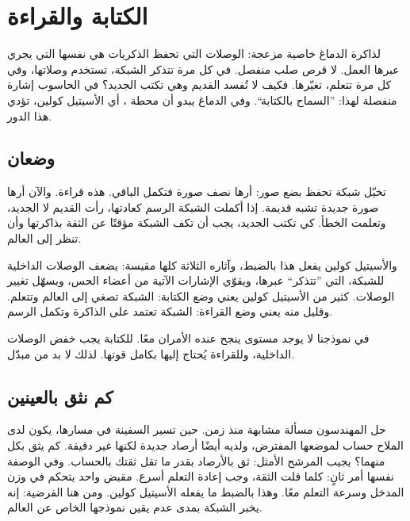 \chapter{الكتابة والقراءة}

لذاكرة الدماغ خاصية مزعجة: الوصلات التي تحفظ الذكريات هي نفسها التي يجري عبرها العمل. لا قرص صلب منفصل. في كل مرة تتذكر الشبكة، تستخدم وصلاتها، وفي كل مرة تتعلم، تغيّرها. فكيف لا تُفسد القديم وهي تكتب الجديد؟ في الحاسوب إشارة منفصلة لهذا: ”السماح بالكتابة“. وفي الدماغ يبدو أن محطة ، أي الأسيتيل كولين، تؤدي هذا الدور.

\section*{وضعان}

تخيّل شبكة تحفظ بضع صور: أرها نصف صورة فتكمل الباقي. هذه قراءة. والآن أرها صورة جديدة تشبه قديمة. إذا أكملت الشبكة الرسم كعادتها، رأت القديم لا الجديد، وتعلمت الخطأ. كي تكتب الجديد، يجب أن تكف الشبكة مؤقتًا عن الثقة بذاكرتها وأن تنظر إلى العالم.


والأسيتيل كولين يفعل هذا بالضبط، وآثاره الثلاثة كلها مقيسة: يضعف الوصلات الداخلية للشبكة، التي ”تتذكر“ عبرها، ويقوّي الإشارات الآتية من أعضاء الحس، ويسهّل تغيير الوصلات. كثير من الأسيتيل كولين يعني وضع الكتابة: الشبكة تصغي إلى العالم وتتعلم. وقليل منه يعني وضع القراءة: الشبكة تعتمد على الذاكرة وتكمل الرسم.

في نموذجنا لا يوجد مستوى ينجح عنده الأمران معًا. للكتابة يجب خفض الوصلات الداخلية، وللقراءة يُحتاج إليها بكامل قوتها. لذلك لا بد من مبدّل.

\section*{كم نثق بالعينين}

حل المهندسون مسألة مشابهة منذ زمن. حين تسير السفينة في مسارها، يكون لدى الملاح حساب لموضعها المفترض، ولديه أيضًا أرصاد جديدة لكنها غير دقيقة. كم يثق بكل منهما؟ يجيب المرشح الأمثل: ثق بالأرصاد بقدر ما تقل ثقتك بالحساب. وفي الوصفة نفسها أمر ثانٍ: كلما قلت الثقة، وجب إعادة التعلم أسرع. مقبض واحد يتحكم في وزن المدخل وسرعة التعلم معًا. وهذا بالضبط ما يفعله الأسيتيل كولين. ومن هنا الفرضية: إنه يخبر الشبكة بمدى عدم يقين نموذجها الخاص عن العالم.


